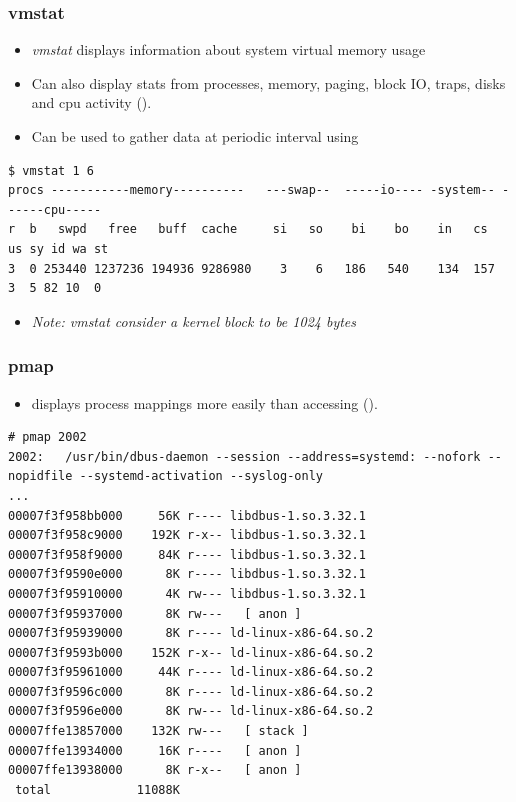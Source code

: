 \begin{frame}[fragile]
  \frametitle{vmstat}
  \begin{itemize}
    \item {\em vmstat} displays information about system virtual memory usage
    \item Can also display stats from processes, memory, paging, block IO,
          traps, disks and cpu activity ().
    \item Can be used to gather data at periodic interval using 
  \end{itemize}
  \begin{block}{}
    \begin{verbatim}
$ vmstat 1 6
procs -----------memory----------   ---swap--  -----io---- -system-- ------cpu-----
r  b   swpd   free   buff  cache     si   so    bi    bo    in   cs  us sy id wa st
3  0 253440 1237236 194936 9286980    3    6   186   540    134  157  3  5 82 10  0
    \end{verbatim}
  \end{block}
  \begin{itemize}
    \item {\em Note: vmstat consider a kernel block to be 1024 bytes}
  \end{itemize}
\end{frame}

\begin{frame}[fragile]
  \frametitle{pmap}
  \begin{itemize}
    \item {} displays process mappings more easily than
          accessing  ().
  \end{itemize}
  \begin{block}{}
    \begin{verbatim}
# pmap 2002
2002:   /usr/bin/dbus-daemon --session --address=systemd: --nofork --nopidfile --systemd-activation --syslog-only
...
00007f3f958bb000     56K r---- libdbus-1.so.3.32.1
00007f3f958c9000    192K r-x-- libdbus-1.so.3.32.1
00007f3f958f9000     84K r---- libdbus-1.so.3.32.1
00007f3f9590e000      8K r---- libdbus-1.so.3.32.1
00007f3f95910000      4K rw--- libdbus-1.so.3.32.1
00007f3f95937000      8K rw---   [ anon ]
00007f3f95939000      8K r---- ld-linux-x86-64.so.2
00007f3f9593b000    152K r-x-- ld-linux-x86-64.so.2
00007f3f95961000     44K r---- ld-linux-x86-64.so.2
00007f3f9596c000      8K r---- ld-linux-x86-64.so.2
00007f3f9596e000      8K rw--- ld-linux-x86-64.so.2
00007ffe13857000    132K rw---   [ stack ]
00007ffe13934000     16K r----   [ anon ]
00007ffe13938000      8K r-x--   [ anon ]
 total            11088K
    \end{verbatim}
  \end{block}
\end{frame}

